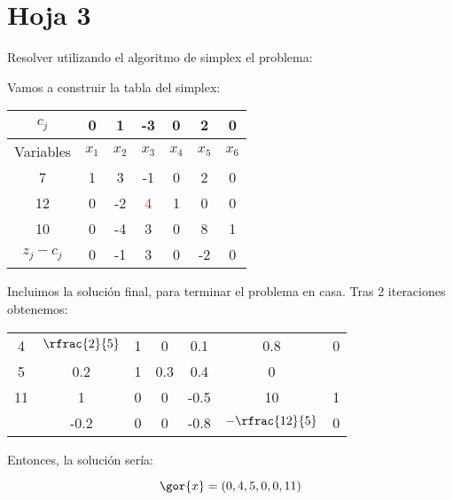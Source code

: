 \section{Hoja 3}

\begin{problem}[1]

Resolver utilizando el algoritmo de simplex el problema:

\begin{ioprob}
\end{ioprob}

\solution

Vamos a construir la tabla del simplex:


\begin{table}[hbtp]
\centering
\begin{tabular}{c|cccccc}
$c_j$&0&1&-3&0&2&0\\\hline
Variables & $x_1$&$x_2$&$x_3$&$x_4$&$x_5$&$x_6$\\\hline
7&1&3&-1&0&2&0\\
12&0&-2&\textcolor{red}{4}&1&0&0\\
10&0&-4&3&0&8&1\\\hline
$z_j - c_j$ & 0&-1&3&0&-2&0
\end{tabular}
\end{table}

Incluimos la solución final, para terminar el problema en casa. Tras 2 iteraciones obtenemos:


\begin{table}[hbtp]
\centering
\begin{tabular}{c|cccccc}
\hline
4&$\rfrac{2}{5}$&1&0&0.1&0.8&0\\
5&0.2&1&0.3&0.4&0\\
11&1&0&0&-0.5&10&1\\\hline
&-0.2&0&0&-0.8&$-\rfrac{12}{5}$&0
\end{tabular}
\end{table}

Entonces, la solución sería:

\[
\gor{x} = (0,4,5,0,0,11)
\]
\end{problem}

\begin{problem}

\solution
{}
\end{problem}

